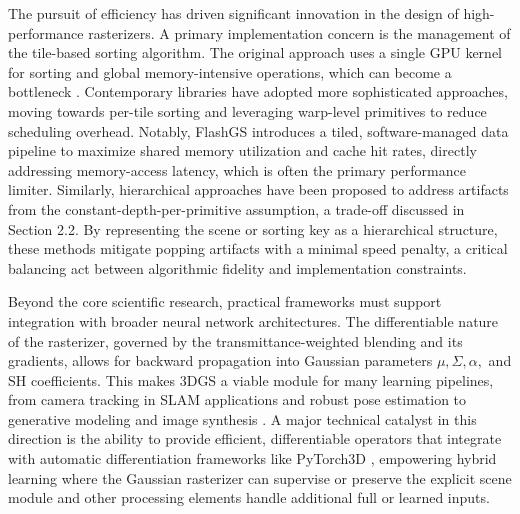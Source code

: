 \documentclass[11pt,a4paper]{article}
\begin{document}
The pursuit of efficiency has driven significant innovation in the design of high-performance rasterizers. A primary implementation concern is the management of the tile-based sorting algorithm. The original approach uses a single GPU kernel for sorting and global memory-intensive operations, which can become a bottleneck \cite{arxiv:2308.04079v1}. Contemporary libraries have adopted more sophisticated approaches, moving towards per-tile sorting and leveraging warp-level primitives to reduce scheduling overhead. Notably, FlashGS \cite{arxiv:2311.17245v5} introduces a tiled, software-managed data pipeline to maximize shared memory utilization and cache hit rates, directly addressing memory-access latency, which is often the primary performance limiter. Similarly, hierarchical approaches \cite{arxiv:2406.12080v1,arxiv:2403.17898v1} have been proposed to address artifacts from the constant-depth-per-primitive assumption, a trade-off discussed in Section 2.2. By representing the scene or sorting key as a hierarchical structure, these methods mitigate popping artifacts with a minimal speed penalty, a critical balancing act between algorithmic fidelity and implementation constraints.

Beyond the core scientific research, practical frameworks must support integration with broader neural network architectures. The differentiable nature of the rasterizer, governed by the transmittance-weighted blending and its gradients, allows for backward propagation into Gaussian parameters \( \mu, \Sigma, \alpha, \) and SH coefficients. This makes 3DGS a viable module for many learning pipelines, from camera tracking in SLAM applications \cite{arxiv:2403.16095v1,arxiv:2402.13255v2} and robust pose estimation \cite{arxiv:2403.11831v2} to generative modeling and image synthesis \cite{arxiv:2402.07207v1,arxiv:2404.07199v1}. A major technical catalyst in this direction is the ability to provide efficient, differentiable operators that integrate with automatic differentiation frameworks like PyTorch3D \cite{arxiv:2007.08501v1}, empowering hybrid learning where the Gaussian rasterizer can supervise or preserve the explicit scene module and other processing elements handle additional full or learned inputs.
\end{document}
